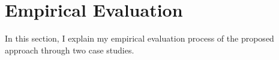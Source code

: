 \chapter{Empirical Evaluation} \label{sec:experiment}
In this section, I explain my empirical evaluation process of the proposed approach through two case studies.


